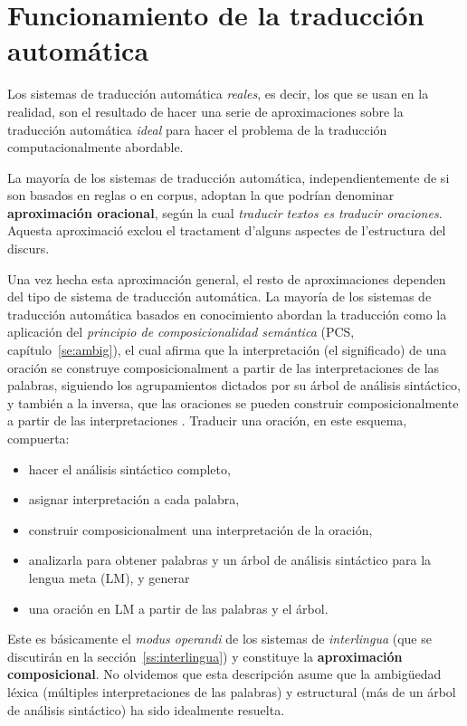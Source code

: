 \section{Funcionamiento de la traducción automática} \label{se:aprox} 

Los sistemas de traducción automática \emph{reales}, es decir, los que se usan en la realidad, son el resultado de hacer una serie de aproximaciones sobre la traducción automática \emph{ideal} para hacer el problema de la traducción computacionalmente abordable. 

La mayoría de los sistemas de traducción automática, independientemente de si son basados en reglas o en corpus, adoptan la que podrían denominar \textbf{aproximación oracional}, según la cual \emph{traducir textos es traducir oraciones}. Aquesta aproximació exclou el tractament d'alguns aspectes de l'estructura del discurs. 

Una vez hecha esta aproximación general, el resto de aproximaciones dependen del tipo de sistema de traducción automática. La mayoría de los sistemas de traducción automática basados en conocimiento abordan la traducción como la aplicación del \emph{principio de composicionalidad semántica} (PCS, capítulo~\ref{se:ambig}), el cual afirma que la interpretación (el significado) de una oración se construye composicionalment a partir de las interpretaciones de las palabras, siguiendo los agrupamientos dictados por su árbol de análisis sintáctico, y también a la inversa, que las oraciones se pueden construir composicionalmente a partir de las interpretaciones \citep{tellier00p}. Traducir una oración, en este esquema, compuerta: \begin{itemize} \item hacer el análisis sintáctico completo, \item asignar interpretación a cada palabra, \item construir composicionalment una interpretación de la oración, \item analizarla para obtener palabras y un árbol de análisis sintáctico para la lengua meta (LM), y generar \item una oración en LM a partir de las palabras y el árbol. \end{itemize} Este es básicamente el \emph{modus operandi} de los sistemas de \emph{interlingua} (que se discutirán en la sección~\ref{ss:interlingua}) y constituye la \textbf{aproximación composicional}. No olvidemos que esta descripción asume que la ambigüedad léxica (múltiples interpretaciones de las palabras) y estructural (más de un árbol de análisis sintáctico) ha sido idealmente resuelta. 

